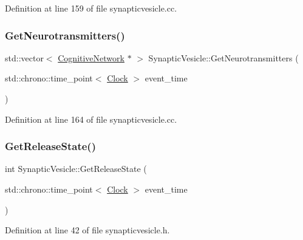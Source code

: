 Definition at line 159 of file synapticvesicle.\+cc.

\mbox{\label{class_synaptic_vesicle_ada95d85873125115208ff51f60fa72e9}} 
\subsubsection{\texorpdfstring{Get\+Neurotransmitters()}{GetNeurotransmitters()}}
{\footnotesize\ttfamily std\+::vector$<$ \mbox{\hyperlink{class_cognitive_network}{Cognitive\+Network}} $\ast$ $>$ Synaptic\+Vesicle\+::\+Get\+Neurotransmitters (\begin{DoxyParamCaption}\item[{std\+::chrono\+::time\+\_\+point$<$ \mbox{\hyperlink{universe_8h_a0ef8d951d1ca5ab3cfaf7ab4c7a6fd80}{Clock}} $>$}]{event\+\_\+time }\end{DoxyParamCaption})}



Definition at line 164 of file synapticvesicle.\+cc.

\mbox{\label{class_synaptic_vesicle_a6cc0018a0fd02cf99f1ba0ad31f495bc}} 
\subsubsection{\texorpdfstring{Get\+Release\+State()}{GetReleaseState()}}
{\footnotesize\ttfamily int Synaptic\+Vesicle\+::\+Get\+Release\+State (\begin{DoxyParamCaption}\item[{std\+::chrono\+::time\+\_\+point$<$ \mbox{\hyperlink{universe_8h_a0ef8d951d1ca5ab3cfaf7ab4c7a6fd80}{Clock}} $>$}]{event\+\_\+time }\end{DoxyParamCaption})\hspace{0.3cm}{\ttfamily [inline]}}



Definition at line 42 of file synapticvesicle.\+h.

\mbox{\label{class_synaptic_vesicle_a045f27b28b8b11edc884568b390c22fe}} 
